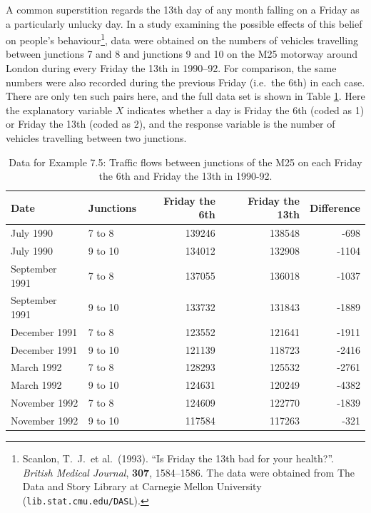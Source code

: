 A common superstition regards the 13th day of any month falling on a
Friday as a particularly unlucky day. In a study examining the possible
effects of this belief on people's behaviour\footnote{Scanlon, T.\ J.\
et al.\ (1993). ``Is Friday the 13th bad for your health?''.
\emph{British Medical Journal}, \textbf{307}, 1584--1586. The data were
obtained from The Data and Story Library at Carnegie Mellon University
(\texttt{lib.stat.cmu.edu/DASL}).}, data were obtained on the numbers of
vehicles travelling between junctions 7 and 8 and junctions 9 and 10 on
the M25 motorway around London during every Friday the 13th in 1990--92.
For comparison, the same numbers were also recorded during the previous
Friday (i.e.\ the 6th) in each case. There are only ten such pairs here,
and the full data set is shown in Table \ref{t_F13}. Here the
explanatory variable $X$ indicates whether a day is Friday the 6th
(coded as 1) or Friday the 13th (coded as 2), and the response variable
is the number of vehicles travelling between two junctions.

\begin{table}
\caption{Data for Example 7.5: Traffic flows between junctions of the
M25 on each Friday the 6th and Friday the 13th in 1990-92.}
\label{t_F13}
\begin{center}
\begin{tabular}{|llrrr|}\hline
Date  & Junctions & Friday the 6th & Friday the 13th & Difference\\
\hline
July 1990		& 7 to 8 	& 139246	& 138548  &  -698\\
July 1990		& 9 to 10	& 134012	& 132908  & -1104 \\
September 1991	& 7 to 8 	& 137055	& 136018  & -1037 \\
September 1991	& 9 to 10	& 133732	& 131843  & -1889  \\
December 1991	& 7 to 8 	& 123552	& 121641  & -1911   \\
December 1991	& 9 to 10	& 121139	& 118723  & -2416    \\
March 1992 		& 7 to 8 	& 128293	& 125532  & -2761\\
March 1992		& 9 to 10	& 124631	& 120249  & -4382 \\
November 1992	& 7 to 8 	& 124609	& 122770  & -1839   \\
November 1992	& 9 to 10	& 117584	& 117263  &  -321     \\
\hline
\end{tabular}
\end{center}
\end{table}


